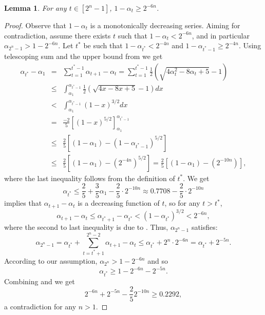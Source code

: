 \documentclass[11pt]{article}
\newtheorem{lemma}{Lemma}
\begin{document}
\begin{lemma}\label{lem:distFrom1}
    For any $t \in [2^n-1]$,  $1-\alpha_t \ge 2^{-6n}$. 
\end{lemma}
\begin{proof}
    Observe that $1-\alpha_t$ is a monotonically decreasing series. 
    Aiming for contradiction, assume there exists $t$ such that $1-\alpha_t <2^{-6n}$, and in particular $\alpha_{2^n-1} > 1- 2^{-6n}$.
    Let $t^*$ be such that
    $1-\alpha_{t^*} < 2^{-4n}$ and $1-\alpha_{t^*-1} \ge 2^{-4n}$.
    Using telescoping sum  and the upper bound from  we get 
    \begin{eqnarray*}
        \alpha_{t^*} - \alpha_1
        &=&
        \sum_{t=1}^{t^*-1}\alpha_{t+1} - \alpha_t 
        =
        \sum_{t=1}^{t^*-1}\frac{1}{2}\left( \sqrt{4\alpha_t^2 - 8\alpha_t + 5} -1 \right) \\
        &\le&
        \int_{\alpha_1}^{\alpha_{t^*-1}}\frac{1}{2}\left( \sqrt{4x - 8x + 5} -1 \right) dx \\
        &<&
        \int_{\alpha_1}^{\alpha_{t^*-1}} (1-x)^{3/2} dx \\
        &=&
        \frac{-2}{5}\left[ (1-x)^{5/2} \right]_{\alpha_1}^{\alpha_{t^*-1}} \\
        &\le&
        \frac{2}{5}\left[ (1-\alpha_1) -(1-\alpha_{t^*-1})^{5/2} \right] \\
        &\le&
        \frac{2}{5}\left[ (1-\alpha_1) -(2^{-4n})^{5/2} \right] 
        =
        \frac{2}{5}\left[ (1-\alpha_1) -(2^{-10n}) \right],
    \end{eqnarray*}
    where the last inequality follows from the definition of $t^*$. We get 
    \begin{equation}\label{eq:t*Up}
        \alpha_{t^*} \le \frac{2}{5} + \frac{3}{5}\alpha_1 -\frac{2}{5}\cdot 2^{-10n} \approx 0.7708 - \frac{2}{5}\cdot 2^{-10n}
    \end{equation}
     implies that $\alpha_{t+1} - \alpha_t$ is a decreasing function of $t$,
    so for any $t > t^*$, 
    $$
    \alpha_{t+1} - \alpha_t \le \alpha_{t^*+1} - \alpha_{t^*} < (1-\alpha_{t^*})^{3/2} < 2^{-6n},
    $$
    where the second to last inequality is due to .
    Thus, $\alpha_{2^n-1}$ satisfies:
    $$
    \alpha_{2^n-1} 
    = \alpha_{t^*} + \sum_{t=t^*+1}^{2^n-2} \alpha_{t+1} - \alpha_{t} 
    \le \alpha_{t^*} + 2^n \cdot 2^{-6n}
    = \alpha_{t^*} + 2^{-5n}.
    $$
    According to our assumption, $\alpha_{2^n} > 1-2^{-6n}$ and so 
    \begin{equation}\label{eq:t*Low}
        \alpha_{t^*} \ge 1-2^{-6n}-2^{-5n}.
    \end{equation}
    Combining  and  we get
    $$
    2^{-6n} + 2^{-5n} - \frac{2}{5}2^{-10n} \ge 0.2292,
    $$
    a contradiction for any $n >1$.
\end{proof}
\end{document}

